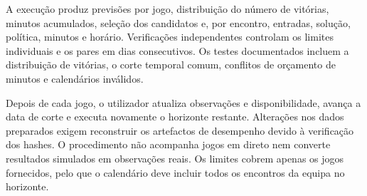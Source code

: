 A execução produz previsões por jogo, distribuição do número de vitórias,
minutos acumulados, seleção dos candidatos e, por encontro, entradas,
solução, política, minutos e horário. Verificações independentes controlam
os limites individuais e os pares em dias consecutivos. Os testes
documentados incluem a distribuição de vitórias, o corte temporal comum,
conflitos de orçamento de minutos e calendários inválidos.

Depois de cada jogo, o utilizador atualiza observações e disponibilidade,
avança a data de corte e executa novamente o horizonte restante. Alterações
nos dados preparados exigem reconstruir os artefactos de desempenho devido
à verificação dos hashes. O procedimento não acompanha jogos em direto
nem converte resultados simulados em observações reais. Os limites cobrem
apenas os jogos fornecidos, pelo que o calendário deve incluir todos os
encontros da equipa no horizonte.

